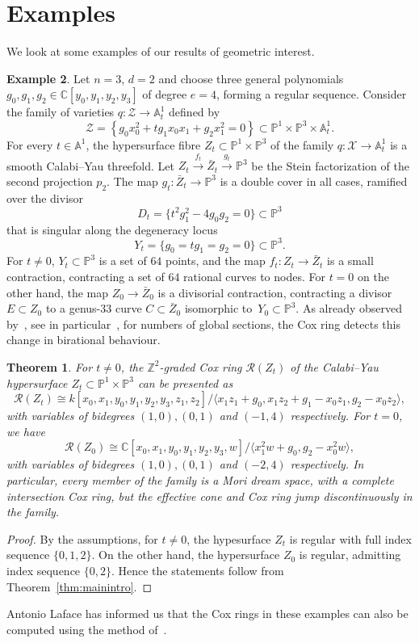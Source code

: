 \documentclass[a4paper,11pt]{amsart}
\theoremstyle{plain}
\newtheorem{theorem}{Theorem}[section]
\theoremstyle{definition}
\newtheorem{example}[theorem]{Example}
\newcommand{\A}{\mathbb{A}}
\newcommand{\C}{\mathbb{C}}
\newcommand{\p}{\mathbb{P}}
\newcommand{\R}{\mathcal{R}}
\newcommand{\Z}{\mathbb{Z}}
\begin{document}
\section{Examples}

We look at some examples of our results of geometric interest. 

\begin{example} \label{ex:def1} Let $n=3$, $d=2$ and choose three general polynomials $g_0,g_1,g_2\in \C[y_0, y_1, y_2,y_3]$ of degree $e=4$, forming a regular sequence. Consider the family of varieties $q\colon {\mathcal Z} \to \A^1_t$ defined by
\[{\mathcal Z} = \left\{g_0 x_0^2 + t g_1 x_0x_1 + g_2 x_1^2 =0 \right\}\subset \p^1\times \p^3\times \A^1_t.
\]
For every $t\in\A^1$, the hypersurface fibre $Z_t\subset \p^1\times \p^3$ of the family $q\colon {\mathcal X} \to \A^1_t$ is a smooth Calabi--Yau threefold. Let $Z_t\stackrel{f_t}\longrightarrow {\bar Z}_t \stackrel{g_t}\longrightarrow \p^3$ be the Stein factorization of the second projection $p_2$. The map $g_t\colon {\bar Z}_t \to \p^3$ is a double cover in all cases, ramified over the divisor
\[ D_t = \{t^2g_1^2-4 g_0g_2=0\}\subset\p^3
\]
that is singular along the degeneracy locus 
\[Y_t=\{g_0=tg_1=g_2=0\}\subset\p^3.\]
For $t\neq 0$, $Y_t\subset\p^3$ is a set of $64$ points, and the map $f_t\colon Z_t\to {\bar Z}_t$ is a small contraction, contracting a set of $64$ rational curves to nodes. For $t=0$ on the other hand, the map $Z_0\to {\bar Z}_0$ is a divisorial contraction, contracting a divisor $E\subset Z_0$ to a genus-$33$ curve $C\subset {\bar Z}_0$ isomorphic 
to~$Y_0\subset \p^3$. As already observed by~\cite{constantinetal}, see in particular~\cite[3.3.2-3.3.3]{constantin}, for numbers of global sections, the Cox ring detects this change in birational behaviour. 
\begin{theorem}\label{thm_cy} For $t\neq 0$, the $\Z^2$-graded Cox ring $\R(Z_t)$ of the Calabi--Yau hypersurface $Z_t\subset \p^1\times \p^3$ can be presented as
\[ \R(Z_t)\cong k[x_0,x_1,y_0,y_1,y_2,y_3,z_1,z_2]/\langle x_1 z_1 + g_0, x_1 z_2 + g_1 - x_0 z_1, g_2 - x_0 z_2\rangle,\]
with variables of bidegrees $(1,0), (0,1)$ and $(-1,4)$ respectively. 
For $t=0$, we have 
\[\R(Z_0)\cong \C[x_0,x_1,y_0,y_1,y_2,y_3,w]/\langle x_1^2 w + g_0, g_2 - x_0^2 w\rangle,\]
with variables of bidegrees $(1,0), (0,1)$ and $(-2,4)$ respectively. 
In particular, every member of the family is a Mori dream space, with a complete intersection Cox ring, but the effective cone and Cox ring jump discontinuously in the family.  
\end{theorem}
\begin{proof} By the assumptions, for $t\neq 0$, the hypesurface $Z_t$ is regular with full index sequence $\{0,1,2\}$. On the other hand, the hypersurface $Z_0$ is regular, admitting index sequence $\{0,2\}$. Hence the statements follow from Theorem~\ref{thm:mainintro}. 
\end{proof}
Antonio Laface has informed us that the Cox rings in these examples can also be computed using the method of~\cite{lafaceetal}. 
\end{example}
\end{document}
